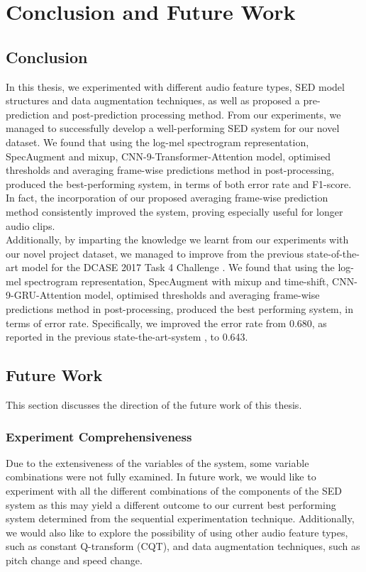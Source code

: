 
\chapter{Conclusion and Future Work}

\section{Conclusion}
In this thesis, we experimented with different audio feature types, SED model structures and data augmentation techniques, as well as proposed a pre-prediction and post-prediction processing method. From our experiments, we managed to successfully develop a well-performing SED system for our novel dataset. We found that using the log-mel spectrogram representation, SpecAugment and mixup, CNN-9-Transformer-Attention model, optimised thresholds and averaging frame-wise predictions method in post-processing, produced the best-performing system, in terms of both error rate and F1-score. In fact, the incorporation of our proposed averaging frame-wise prediction method consistently improved the system, proving especially useful for longer audio clips.\\

Additionally, by imparting the knowledge we learnt from our experiments with our novel project dataset, we managed to improve from the previous state-of-the-art model for the DCASE 2017 Task 4 Challenge \cite{kong2020sound}. We found that using the log-mel spectrogram representation, SpecAugment with mixup and time-shift, CNN-9-GRU-Attention model, optimised thresholds and averaging frame-wise predictions method in post-processing, produced the best performing system, in terms of error rate. Specifically, we improved the error rate from 0.680, as reported in the previous state-the-art-system \cite{kong2020sound}, to 0.643.

\section{Future Work}
This section discusses the direction of the future work of this thesis.

\subsection{Experiment Comprehensiveness}
Due to the extensiveness of the variables of the system, some variable combinations were not fully examined. In future work, we would like to experiment with all the different combinations of the components of the SED system as this may yield a different outcome to our current best performing system determined from the sequential experimentation technique. Additionally, we would also like to explore the possibility of using other audio feature types, such as constant Q-transform (CQT), and data augmentation techniques, such as pitch change and speed change.

